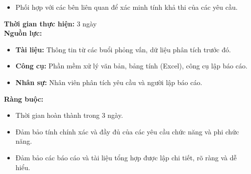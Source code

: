 {\begin{minipage}{\textwidth}
\begin{itemize}
\begin{itemize}
            \item Yêu cầu chức năng: Các chức năng cụ thể phần mềm cần thực hiện.
            \item Yêu cầu phi chức năng: Các tiêu chí kỹ thuật như hiệu suất, bảo mật, khả năng bảo trì,...
        \end{itemize}
        \item Phối hợp với các bên liên quan để xác minh tính khả thi của các yêu cầu.
    \end{itemize}
    \noindent \textbf{Thời gian thực hiện:} 3 ngày \\
    \noindent \textbf{Nguồn lực:}
    \begin{itemize}
        \item \textbf{Tài liệu:} Thông tin từ các buổi phỏng vấn, dữ liệu phân tích trước đó.
        \item \textbf{Công cụ:} Phần mềm xử lý văn bản, bảng tính (Excel), công cụ lập báo cáo.
        \item \textbf{Nhân sự:} Nhân viên phân tích yêu cầu và người lập báo cáo.
    \end{itemize}
    \noindent \textbf{Ràng buộc:}
    \begin{itemize}
        \item Thời gian hoàn thành trong 3 ngày.
        \item Đảm bảo tính chính xác và đầy đủ của các yêu cầu chức năng và phi chức năng.
        \item Đảm bảo các báo cáo và tài liệu tổng hợp được lập chi tiết, rõ ràng và dễ hiểu.
    \end{itemize}
    \end{minipage}
}
\newpage %
